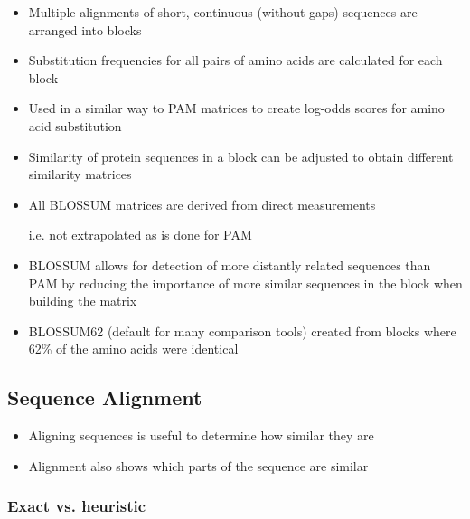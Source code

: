 \documentclass[a4paper]{article}
\begin{document}
\begin{itemize}
  \item
    Multiple alignments of short, continuous (without gaps) sequences are
    arranged into blocks

  \item
    Substitution frequencies for all pairs of amino acids are calculated for
    each block

  \item
    Used in a similar way to PAM matrices to create log-odds scores for amino
    acid substitution

  \item
    Similarity of protein sequences in a block can be adjusted to obtain
    different similarity matrices

  \item
    All BLOSSUM matrices are derived from direct measurements

    i.e. not extrapolated as is done for PAM

  \item
    BLOSSUM allows for detection of more distantly related sequences than PAM
    by reducing the importance of more similar sequences in the block when
    building the matrix

  \item
    BLOSSUM62 (default for many comparison tools) created from blocks where 62\%
    of the amino acids were identical
\end{itemize}

\subsection{Sequence Alignment}

\begin{itemize}
  \item
    Aligning sequences is useful to determine how similar they are

  \item
    Alignment also shows which parts of the sequence are similar
\end{itemize}

\subsubsection{Exact vs. heuristic}
\end{document}
